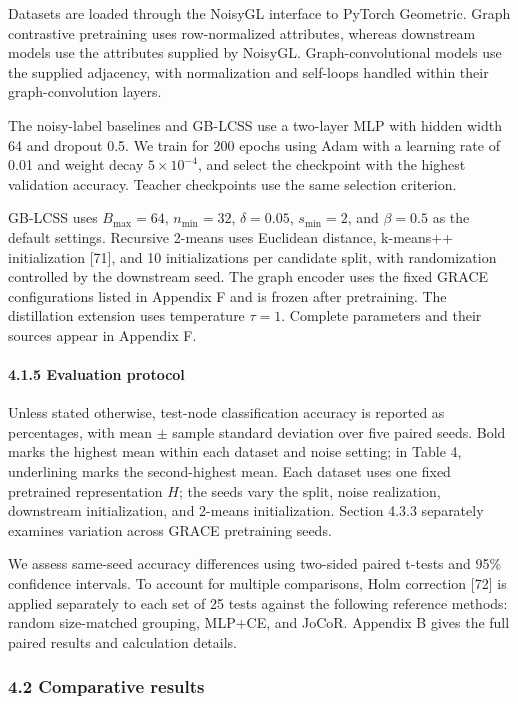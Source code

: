 Datasets are loaded through the NoisyGL interface to PyTorch Geometric. Graph contrastive pretraining uses row-normalized attributes, whereas downstream models use the attributes supplied by NoisyGL. Graph-convolutional models use the supplied adjacency, with normalization and self-loops handled within their graph-convolution layers.

The noisy-label baselines and GB-LCSS use a two-layer MLP with hidden width 64 and dropout 0.5. We train for 200 epochs using Adam with a learning rate of 0.01 and weight decay \(5 \times 10^{- 4}\), and select the checkpoint with the highest validation accuracy. Teacher checkpoints use the same selection criterion.

GB-LCSS uses \(B_{\max} = 64\), \(n_{\min} = 32\), \(\delta = 0.05\), \(s_{\min} = 2\), and \(\beta = 0.5\) as the default settings. Recursive 2-means uses Euclidean distance, k-means++ initialization {[}71{]}, and 10 initializations per candidate split, with randomization controlled by the downstream seed. The graph encoder uses the fixed GRACE configurations listed in Appendix F and is frozen after pretraining. The distillation extension uses temperature \(\tau = 1\). Complete parameters and their sources appear in Appendix F.

\paragraph{4.1.5 Evaluation protocol}\label{evaluation-protocol}

Unless stated otherwise, test-node classification accuracy is reported as percentages, with mean \(\pm\) sample standard deviation over five paired seeds. Bold marks the highest mean within each dataset and noise setting; in Table 4, underlining marks the second-highest mean. Each dataset uses one fixed pretrained representation \(H\); the seeds vary the split, noise realization, downstream initialization, and 2-means initialization. Section 4.3.3 separately examines variation across GRACE pretraining seeds.

We assess same-seed accuracy differences using two-sided paired t-tests and 95\% confidence intervals. To account for multiple comparisons, Holm correction {[}72{]} is applied separately to each set of 25 tests against the following reference methods: random size-matched grouping, MLP+CE, and JoCoR. Appendix B gives the full paired results and calculation details.

\subsubsection{4.2 Comparative results}\label{comparative-results}

